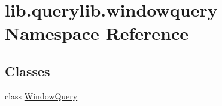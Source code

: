 \hypertarget{namespacelib_1_1querylib_1_1windowquery}{\section{lib.\-querylib.\-windowquery Namespace Reference}
\label{namespacelib_1_1querylib_1_1windowquery}
}
\subsection*{Classes}
\begin{DoxyCompactItemize}
\item 
class \hyperlink{classlib_1_1querylib_1_1windowquery_1_1_window_query}{Window\-Query}
\end{DoxyCompactItemize}
